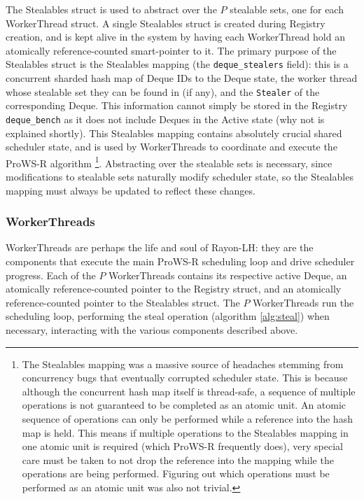 \documentclass[bsc,frontabs,singlespacing,parskip,deptreport,normalheadings]{infthesis}
\begin{document}
The Stealables struct is used to abstract over the \(P\) stealable sets, one for
each WorkerThread struct. A single Stealables struct is created during Registry
creation, and is kept alive in the system by having each WorkerThread hold an
atomically reference-counted smart-pointer to it. The primary purpose of the
Stealables struct is the Stealables mapping (the \texttt{deque\_stealers} field):
this is a concurrent sharded hash map of Deque IDs to the Deque state, the
worker thread whose stealable set they can be found in (if any), and the \texttt{Stealer}
of the corresponding Deque. This information cannot simply be stored in the
Registry \texttt{deque\_bench} as it does not include Deques in the Active state
(why not is explained shortly). This Stealables mapping contains absolutely
crucial shared scheduler state, and is used by WorkerThreads to coordinate and
execute the ProWS-R algorithm \footnote{The Stealables mapping was a massive
source of headaches stemming from concurrency bugs that eventually corrupted
scheduler state. This is because although the concurrent hash map itself is thread-safe,
a sequence of multiple operations is not guaranteed to be completed as an atomic
unit. An atomic sequence of operations can only be performed while a reference
into the hash map is held. This means if multiple operations to the Stealables
mapping in one atomic unit is required (which ProWS-R frequently does), very
special care must be taken to not drop the reference into the mapping while the
operations are being performed. Figuring out which operations must be performed
as an atomic unit was also not trivial.}. Abstracting over the stealable sets is
necessary, since modifications to stealable sets naturally modify scheduler
state, so the Stealables mapping must always be updated to reflect these
changes.

\subsubsection*{WorkerThreads}

WorkerThreads are perhaps the life and soul of Rayon-LH: they are the components
that execute the main ProWS-R scheduling loop and drive scheduler progress. Each
of the \(P\) WorkerThreads contains its respective active Deque, an atomically
reference-counted pointer to the Registry struct, and an atomically
reference-counted pointer to the Stealables struct. The \(P\) WorkerThreads run
the scheduling loop, performing the steal operation (algorithm \ref{alg:steal})
when necessary, interacting with the various components described above.
\end{document}
